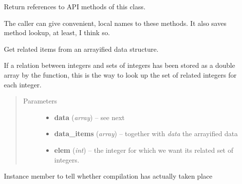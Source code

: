\documentclass[letterpaper,10pt,english]{sphinxmanual}
\begin{document}
\begin{fulllineitems}
\begin{fulllineitems}
\label{graf/graf:graf.task.GrafTask.get_mappings}
Return references to API methods of this class.

The caller can give convenient, local names to these methods.
It also saves method lookup,
at least, I think so.

\end{fulllineitems}


\begin{fulllineitems}
\label{graf/graf:graf.task.GrafTask.getitems}
Get related items from an arrayified data structure.

If a relation between integers and sets of integers has been stored as a double array
by the {\hyperref[graf/graf:graf.model.arrayify]{}} function,
this is the way to look up the set of related integers for each integer.
\begin{quote}\begin{description}
\item[{Parameters}] \leavevmode\begin{itemize}
\item {} 
\textbf{data} (\emph{array}) --
see next

\item {} 
\textbf{data\_items} (\emph{array}) --
together with \emph{data} the arrayified data

\item {} 
\textbf{elem} (\emph{int}) --
the integer for which we want its related set of integers.

\end{itemize}

\end{description}\end{quote}

\end{fulllineitems}


\begin{fulllineitems}
\label{graf/graf:graf.task.GrafTask.has_compiled}
Instance member to tell whether compilation has actually taken place

\end{fulllineitems}


\end{fulllineitems}
\end{document}

